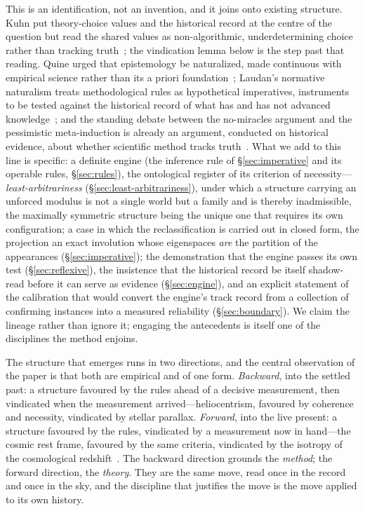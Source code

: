 \documentclass[11pt,a4paper]{article}
\begin{document}
This is an identification, not an invention, and it joins onto existing structure. Kuhn put theory-choice values and the historical record at the centre of the question but read the shared values as non-algorithmic, underdetermining choice rather than tracking truth~\cite{Kuhn1962}; the vindication lemma below is the step past that reading. Quine urged that epistemology be naturalized, made continuous with empirical science rather than its a priori foundation~\cite{Quine1969}; Laudan's normative naturalism treats methodological rules as hypothetical imperatives, instruments to be tested against the historical record of what has and has not advanced knowledge~\cite{Laudan1977, Laudan1987}; and the standing debate between the no-miracles argument and the pessimistic meta-induction is already an argument, conducted on historical evidence, about whether scientific method tracks truth~\cite{Putnam1975, Laudan1981}. What we add to this line is specific: a definite engine (the inference rule of \S\ref{sec:imperative} and its operable rules, \S\ref{sec:rules}), the ontological register of its criterion of necessity---\emph{least-arbitrariness} (\S\ref{sec:least-arbitrariness}), under which a structure carrying an unforced modulus is not a single world but a family and is thereby inadmissible, the maximally symmetric structure being the unique one that requires its own configuration; a case in which the reclassification is carried out in closed form, the projection an exact involution whose eigenspaces \emph{are} the partition of the appearances (\S\ref{sec:imperative}); the demonstration that the engine passes its own test (\S\ref{sec:reflexive}), the insistence that the historical record be itself shadow-read before it can serve as evidence (\S\ref{sec:engine}), and an explicit statement of the calibration that would convert the engine's track record from a collection of confirming instances into a measured reliability (\S\ref{sec:boundary}). We claim the lineage rather than ignore it; engaging the antecedents is itself one of the disciplines the method enjoins.

The structure that emerges runs in two directions, and the central observation of the paper is that both are empirical and of one form. \emph{Backward}, into the settled past: a structure favoured by the rules ahead of a decisive measurement, then vindicated when the measurement arrived---heliocentrism, favoured by coherence and necessity, vindicated by stellar parallax. \emph{Forward}, into the live present: a structure favoured by the rules, vindicated by a measurement now in hand---the cosmic rest frame, favoured by the same criteria, vindicated by the isotropy of the cosmological redshift~\cite{JanzenModernParallax}. The backward direction grounds the \emph{method}; the forward direction, the \emph{theory}. They are the same move, read once in the record and once in the sky, and the discipline that justifies the move is the move applied to its own history.
\end{document}
